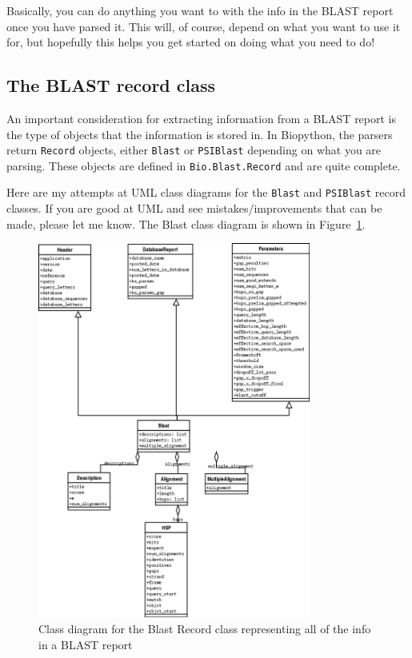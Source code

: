 \documentclass{report}
\begin{document}
Basically, you can do anything you want to with the info in the BLAST
report once you have parsed it. This will, of course, depend on what
you want to use it for, but hopefully this helps you get started on
doing what you need to do!

\subsection{The BLAST record class}

An important consideration for extracting information from a BLAST report is the type of objects that the information is stored in. In Biopython, the parsers return \verb|Record| objects, either \verb|Blast| or \verb|PSIBlast| depending on what you are parsing. These objects are defined in \verb|Bio.Blast.Record| and are quite complete.


Here are my attempts at UML class diagrams for the \verb|Blast| and \verb|PSIBlast| record classes. If you are good at UML and see mistakes/improvements that can be made, please let me know. The Blast class diagram is shown in Figure~\ref{fig:blastrecord}.

\begin{htmlonly}
\label{fig:blastrecord}
\end{htmlonly}

\begin{latexonly}
\begin{figure}[htbp]
\centering
\includegraphics[width=0.8\textwidth]{images/BlastRecord.png}
\caption{Class diagram for the Blast Record class representing all of the info in a BLAST report}
\label{fig:blastrecord}
\end{figure}
\end{latexonly}
\end{document}
